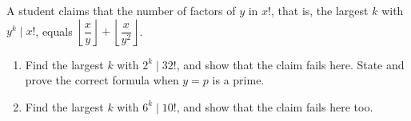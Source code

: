 A student claims that the number of factors of $y$ in $x!$, that is, the largest $k$ with $y^k\mid x!$, equals $\left\lfloor\dfrac xy\right\rfloor+\left\lfloor\dfrac x{y^2}\right\rfloor$.
\begin{enumerate}
\item[(a)] Find the largest $k$ with $2^k\mid32!$, and show that the claim fails here. State and prove the correct formula when $y=p$ is a prime.
\item[(b)] Find the largest $k$ with $6^k\mid10!$, and show that the claim fails here too.
\end{enumerate}
